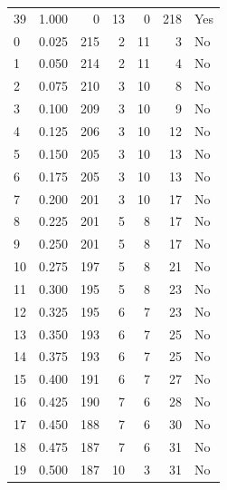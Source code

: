 \documentclass[a4paper,twoside,12pt]{book}
\begin{document}
\begin{appendices}
\begin{table}
\begin{tabular}{lrrrrrl}
		39 &  1.000 &         0 &        13 &               0 &             218 &    Yes \\
		0  &  0.025 &       215 &         2 &              11 &               3 &     No \\
		1  &  0.050 &       214 &         2 &              11 &               4 &     No \\
		2  &  0.075 &       210 &         3 &              10 &               8 &     No \\
		3  &  0.100 &       209 &         3 &              10 &               9 &     No \\
		4  &  0.125 &       206 &         3 &              10 &              12 &     No \\
		5  &  0.150 &       205 &         3 &              10 &              13 &     No \\
		6  &  0.175 &       205 &         3 &              10 &              13 &     No \\
		7  &  0.200 &       201 &         3 &              10 &              17 &     No \\
		8  &  0.225 &       201 &         5 &               8 &              17 &     No \\
		9  &  0.250 &       201 &         5 &               8 &              17 &     No \\
		10 &  0.275 &       197 &         5 &               8 &              21 &     No \\
		11 &  0.300 &       195 &         5 &               8 &              23 &     No \\
		12 &  0.325 &       195 &         6 &               7 &              23 &     No \\
		13 &  0.350 &       193 &         6 &               7 &              25 &     No \\
		14 &  0.375 &       193 &         6 &               7 &              25 &     No \\
		15 &  0.400 &       191 &         6 &               7 &              27 &     No \\
		16 &  0.425 &       190 &         7 &               6 &              28 &     No \\
		17 &  0.450 &       188 &         7 &               6 &              30 &     No \\
		18 &  0.475 &       187 &         7 &               6 &              31 &     No \\
		19 &  0.500 &       187 &        10 &               3 &              31 &     No \\

\end{tabular}
\end{table}
\end{appendices}
\end{document}
